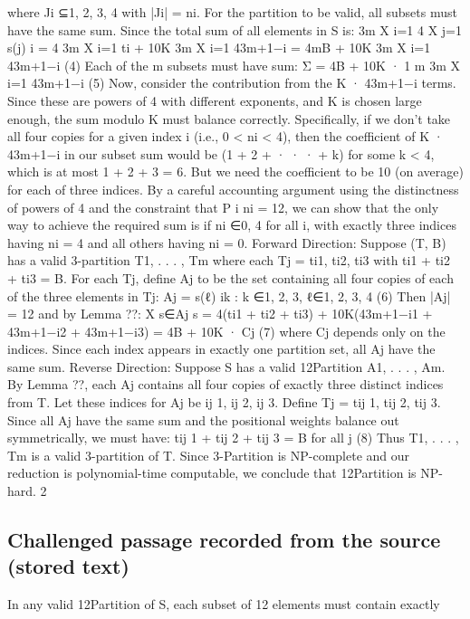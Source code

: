 \documentclass[11pt]{article}
\begin{document}
\begin{Vsrc}
where Ji ⊆{1, 2, 3, 4} with |Ji| = ni.
For the partition to be valid, all subsets must have the same sum. Since the total sum
of all elements in S is:
3m
X
i=1
4
X
j=1
s(j)
i
= 4
3m
X
i=1
ti + 10K
3m
X
i=1
43m+1−i = 4mB + 10K
3m
X
i=1
43m+1−i
(4)
Each of the m subsets must have sum:
Σ = 4B + 10K · 1
m
3m
X
i=1
43m+1−i
(5)
Now, consider the contribution from the K · 43m+1−i terms. Since these are powers of 4
with different exponents, and K is chosen large enough, the sum modulo K must balance
correctly.
Specifically, if we don’t take all four copies for a given index i (i.e., 0 < ni < 4), then the
coefficient of K · 43m+1−i in our subset sum would be (1 + 2 + · · · + k) for some k < 4, which
is at most 1 + 2 + 3 = 6. But we need the coefficient to be 10 (on average) for each of three
indices.
By a careful accounting argument using the distinctness of powers of 4 and the constraint
that P
i ni = 12, we can show that the only way to achieve the required sum is if ni ∈{0, 4}
for all i, with exactly three indices having ni = 4 and all others having ni = 0.
Forward Direction: Suppose (T, B) has a valid 3-partition {T1, . . . , Tm} where each
Tj = {ti1, ti2, ti3} with ti1 + ti2 + ti3 = B.
For each Tj, define Aj to be the set containing all four copies of each of the three elements
in Tj:
Aj = {s(ℓ)
ik : k ∈{1, 2, 3}, ℓ∈{1, 2, 3, 4}}
(6)
Then |Aj| = 12 and by Lemma ??:
X
s∈Aj
s = 4(ti1 + ti2 + ti3) + 10K(43m+1−i1 + 43m+1−i2 + 43m+1−i3) = 4B + 10K · Cj
(7)
where Cj depends only on the indices. Since each index appears in exactly one partition set,
all Aj have the same sum.
Reverse Direction: Suppose S has a valid 12Partition {A1, . . . , Am}. By Lemma ??,
each Aj contains all four copies of exactly three distinct indices from T. Let these indices
for Aj be {ij
1, ij
2, ij
3}.
Define Tj = {tij
1, tij
2, tij
3}. Since all Aj have the same sum and the positional weights
balance out symmetrically, we must have:
tij
1 + tij
2 + tij
3 = B for all j
(8)
Thus {T1, . . . , Tm} is a valid 3-partition of T.
Since 3-Partition is NP-complete and our reduction is polynomial-time computable, we
conclude that 12Partition is NP-hard.
2
\end{Vsrc}
\subsection*{Challenged passage recorded from the source (stored text)}
\begin{Vsrc}
In any valid 12Partition of S, each subset of 12 elements must contain exactly
\end{Vsrc}
\end{document}
